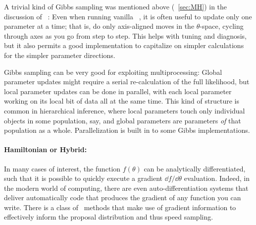 \documentclass[12pt,twoside,pdftex]{article}
\newcommand{\MCMC}{\acronym{MCMC}}
\newcommand{\MH}{\acronym{M--H}}
\newcommand{\pars}{\theta}
\begin{document}
A trivial kind of Gibbs sampling was mentioned above (\sectionname~\ref{sec:MH}) in the
discussion of \MH\ \MCMC:
Even when running vanilla \MH\ \MCMC, it is often useful to update only
one parameter at a time; that is, do only axis-aligned moves in the
$\pars$-space, cycling through axes as you go from step to step.
This helps with tuning and diagnosis, but it also permits a good
implementation to capitalize on simpler calculations for the simpler
parameter directions.

Gibbs sampling can be very good for exploiting multiprocessing:
Global parameter updates might require a serial re-calculation of the
full likelihood, but local parameter updates can be done in parallel,
with each local parameter working on its local bit of data all at the
same time.
This kind of structure is common in hierarchical inference, where
local parameters touch only individual objects in some population,
say, and global parameters are parameters \emph{of} that population as
a whole.
Parallelization is built in to some Gibbs implementations.

\paragraph{Hamiltonian or Hybrid:}
In many cases of interest, the function $f(\pars)$ can be analytically
differentiated, such that it is possible to quickly execute a gradient
$\dd f/\dd\pars$ evaluation.
Indeed, in the modern world of computing, there are even
auto-differentiation systems that deliver automatically code that
produces the gradient of any function you can write.
There is a class of \MCMC\ methods that make use of gradient information
to effectively inform the proposal distribution and thus speed sampling.
\end{document}
